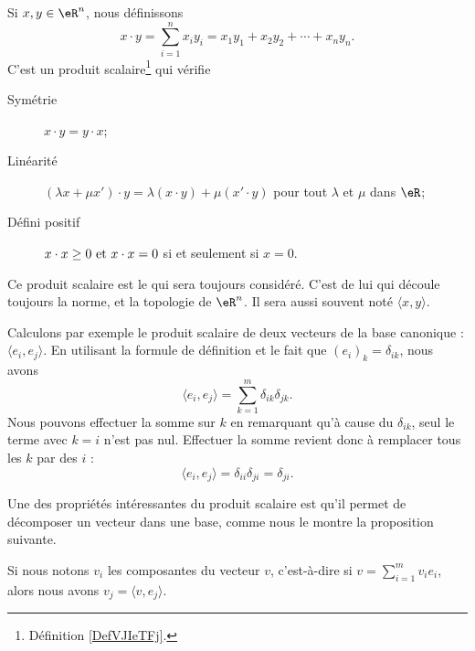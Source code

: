 \begin{propositionDef}     \label{PROPooSKVRooDGVCYj}
	Si \( x,y\in \eR^n\), nous définissons
	\begin{equation}        \label{EQooFITHooEXDCGd}
		x\cdot y=\sum_{i=1}^n x_iy_i =x_1y_1+x_2y_2+\cdots+x_ny_n.
	\end{equation}
	C'est un produit scalaire\footnote{Définition \ref{DefVJIeTFj}.} qui vérifie
	\begin{description}
		\item[Symétrie] \( x\cdot y=y\cdot x\);
		\item[Linéarité] \( (\lambda x+\mu x')\cdot y=\lambda(x\cdot y)+\mu(x'\cdot y)\) pour tout \( \lambda\) et \( \mu\) dans \( \eR\);
		\item[Défini positif] \( x\cdot x\geq 0$ et $x\cdot x=0\) si et seulement si \( x=0\).
	\end{description}
	Ce produit scalaire est le  qui sera toujours considéré. C'est de lui qui découle toujours la norme, et la topologie de \( \eR^n\). Il sera aussi souvent noté \( \langle x, y\rangle \).
\end{propositionDef}


Calculons par exemple le produit scalaire de deux vecteurs de la base canonique : \( \langle e_i, e_j\rangle\). En utilisant la formule de définition et le fait que \( (e_i)_k=\delta_{ik}\), nous avons
\begin{equation}
	\langle e_i, e_j\rangle =\sum_{k=1}^m\delta_{ik}\delta_{jk}.
\end{equation}
Nous pouvons effectuer la somme sur $k$ en remarquant qu'à cause du \( \delta_{ik}\), seul le terme avec \( k=i\) n'est pas nul. Effectuer la somme revient donc à remplacer tous les \( k\) par des \( i\) :
\begin{equation}
	\langle e_i, e_j\rangle =\delta_{ii}\delta_{ji}=\delta_{ji}.
\end{equation}

Une des propriétés intéressantes du produit scalaire est qu'il permet de décomposer un vecteur dans une base, comme nous le montre la proposition suivante.

\begin{proposition}     \label{PropScalCompDec}
	Si nous notons \( v_i\) les composantes du vecteur \( v\), c'est-à-dire si \( v=\sum_{i=1}^m v_ie_i\), alors nous avons \( v_j=\langle v, e_j\rangle\).
\end{proposition}

